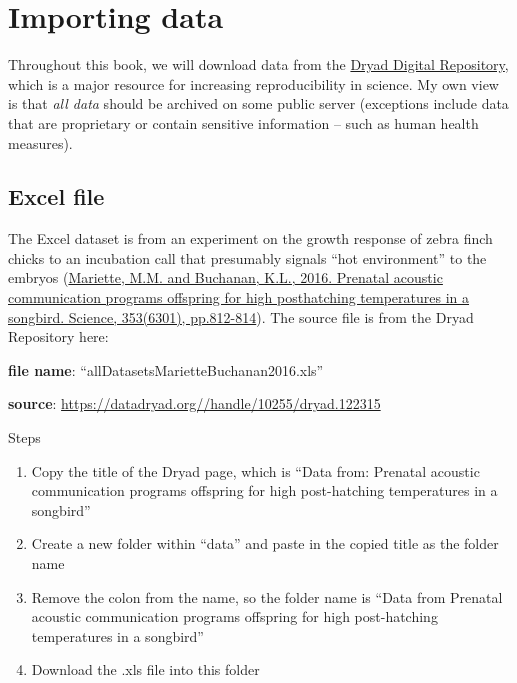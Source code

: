 \documentclass[]{book}
\providecommand{\tightlist}{%
  \setlength{\itemsep}{0pt}\setlength{\parskip}{0pt}}
\begin{document}
\section{Importing data}\label{importing-data}

Throughout this book, we will download data from the
\href{https://datadryad.org}{Dryad Digital Repository}, which is a major
resource for increasing reproducibility in science. My own view is that
\emph{all data} should be archived on some public server (exceptions
include data that are proprietary or contain sensitive information --
such as human health measures).

\subsection{Excel file}\label{excel-file}

The Excel dataset is from an experiment on the growth response of zebra
finch chicks to an incubation call that presumably signals ``hot
environment'' to the embryos
(\href{http://science.sciencemag.org/content/353/6301/812}{Mariette,
M.M. and Buchanan, K.L., 2016. Prenatal acoustic communication programs
offspring for high posthatching temperatures in a songbird. Science,
353(6301), pp.812-814}). The source file is from the Dryad Repository
here:

\textbf{file name}: ``allDatasetsMarietteBuchanan2016.xls''

\textbf{source}: \url{https://datadryad.org//handle/10255/dryad.122315}

Steps

\begin{enumerate}
\def\labelenumi{\arabic{enumi}.}
\tightlist
\item
  Copy the title of the Dryad page, which is ``Data from: Prenatal
  acoustic communication programs offspring for high post-hatching
  temperatures in a songbird''
\item
  Create a new folder within ``data'' and paste in the copied title as
  the folder name
\item
  Remove the colon from the name, so the folder name is ``Data from
  Prenatal acoustic communication programs offspring for high
  post-hatching temperatures in a songbird''
\item
  Download the .xls file into this folder
\end{enumerate}
\end{document}
